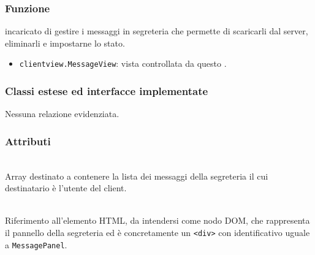
\subsubsection*{Funzione}
 incaricato di gestire i messaggi in segreteria che permette di scaricarli dal server, eliminarli e impostarne lo stato.

\begin{itemize}
  \item \texttt{clientview.MessageView}: vista controllata da questo .
\end{itemize}

\subsubsection*{Classi estese ed interfacce implementate}
Nessuna relazione evidenziata.

\subsubsection*{Attributi}
\begin{description}
 \item{}\\
 Array destinato a contenere la lista dei messaggi della segreteria il cui destinatario è l'utente del client.

 \item{}\\
  Riferimento all'elemento HTML, da intendersi come nodo DOM, che rappresenta il pannello della segreteria ed è concretamente un \verb'<div>' con identificativo uguale a \verb'MessagePanel'.
\end{description}

